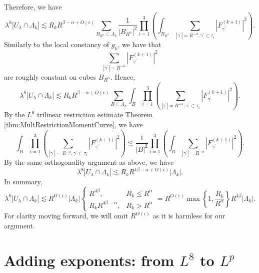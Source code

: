 \documentclass[12pt]{amsart}
\begin{document}
Therefore, we have $$\lambda^8|U_{\lambda}\cap \Lambda_k|\lesssim R_kR^{\beta - \alpha+O(\epsilon)}\sum_{B_{R^\alpha}\subset \Lambda_k}\frac{1}{|B_{R^\alpha}|^2}\prod_{i=1}^3 \left(\int_{B_{R^\alpha}}\sum_{|\gamma^\prime|=R^{-\alpha}, \gamma^\prime \subset \tau_i}|F_{\gamma^\prime}^{(k+1)}|^2\right).$$ Similarly to the local constancy of $g_k$, we have that $$\sum_{|\gamma^\prime|=R^{-\alpha}}|F_{\gamma^\prime}^{(k+1)}|^2$$ are roughly constant on cubes $B_{R^\alpha}$. Hence, $$\lambda^8|U_{\lambda}\cap \Lambda_k|\lesssim R_kR^{\beta - \alpha+O(\epsilon)}\sum_{B\subset \Lambda_k} \int_{B}\prod_{i=1}^3\left(\sum_{|\gamma^\prime|=R^{-\alpha}, \gamma^\prime \subset \tau_i}|F_{\gamma^\prime}^{(k+1)}|^2\right).$$ By the $L^6$ trilinear restriction estimate Theorem \ref{thm:MultRestrictionMomentCurve}, we have $$\int_{B}\prod_{i=1}^3\left(\sum_{|\gamma^\prime|=R^{-\alpha}, \gamma^\prime \subset \tau_i}|F_{\gamma^\prime}^{(k+1)}|^2\right)\lesssim \frac{1}{|B|^2}\prod_{i=1}^3 \left(\int_B \sum_{|\gamma^\prime|=R^{-\alpha}}|F_{\gamma^\prime}^{(k+1)}|^2\right).$$ By the same orthogonality argument as above, we have $$\lambda^8|U_{\lambda}\cap \Lambda_k| \lesssim R_kR^{4\beta-\alpha+O(\epsilon)}|\Lambda_k|.$$ In summary, \begin{equation*}
    \lambda^8|U_{\lambda}\cap \Lambda_k| \lesssim R^{O(\epsilon)}|\Lambda_k|\begin{cases}
        R^{4\beta}, & R_k\le R^\alpha\\
        R_kR^{4\beta-\alpha},& R_k> R^\alpha
    \end{cases}
    =R^{O(\epsilon)}\max\left\{1, \frac{R_k}{R^\alpha}\right\}R^{4\beta}|\Lambda_k|.
\end{equation*}
For clarity moving forward, we will omit $R^{O(\epsilon)}$ as it is harmless for our argument. 




\section{Adding exponents: from $L^8$ to $L^p$}\label{sec: 8+4=12}
\end{document}
